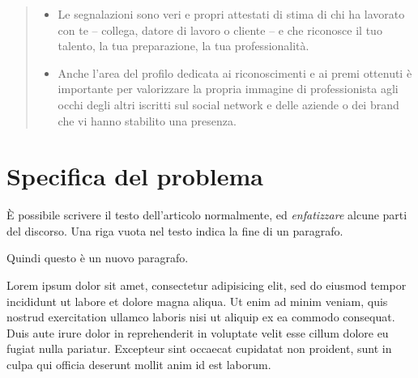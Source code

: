 \documentclass[a4paper,10pt]{report} %
\begin{document}
\begin{abstract}
\begin{itemize}
    percorso di carriera lavorativa, interessi di business simili, una specifica provenienza geografica o altro.
    \item Le segnalazioni sono veri e propri attestati di stima di chi ha lavorato con te –
    collega, datore di lavoro o cliente – e che riconosce il tuo talento, la tua preparazione, la tua professionalità.
    \item Anche l’area del profilo dedicata ai riconoscimenti e ai premi ottenuti è importante
    per valorizzare la propria immagine di professionista agli occhi degli altri iscritti sul social network
    e delle aziende o dei brand che vi hanno stabilito una presenza.
    \end{itemize}
  \end{abstract} %
\newpage
\tableofcontents %
\newpage
\part{Specifica del problema} %
  È possibile scrivere il testo dell'articolo normalmente, ed
  \emph{enfatizzare} alcune parti del discorso. %
  Una riga vuota nel testo indica la fine di un paragrafo.

  Quindi questo è un nuovo paragrafo.

	Lorem ipsum dolor sit amet, consectetur adipisicing elit, sed do eiusmod tempor incididunt ut labore et dolore magna aliqua. Ut enim ad minim veniam, quis nostrud exercitation ullamco laboris nisi ut aliquip ex ea commodo consequat. Duis aute irure dolor in reprehenderit in voluptate velit esse cillum dolore eu fugiat nulla pariatur. Excepteur sint occaecat cupidatat non proident, sunt in culpa qui officia deserunt mollit anim id est laborum.
\newpage
\end{document}
